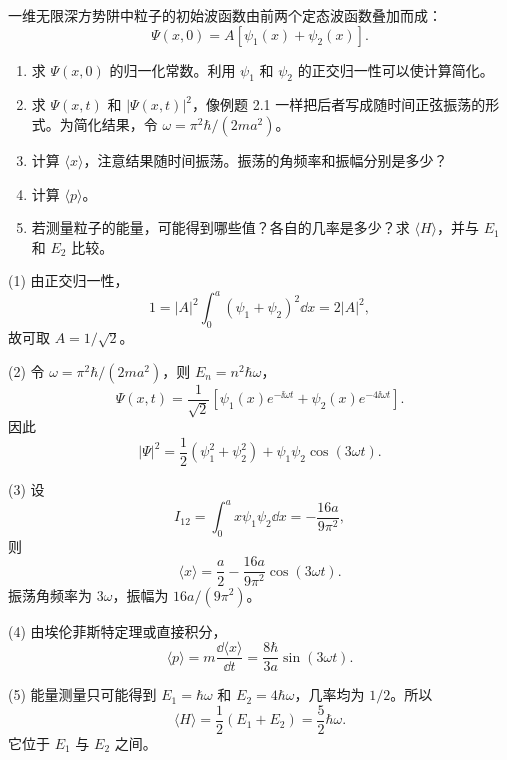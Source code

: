 \begin{question}
一维无限深方势阱中粒子的初始波函数由前两个定态波函数叠加而成：
\[
\Psi(x,0)=A[\psi_1(x)+\psi_2(x)] .
\]
\begin{enumerate}
\item 求 $\Psi(x,0)$ 的归一化常数。利用 $\psi_1$ 和 $\psi_2$ 的正交归一性可以使计算简化。
\item 求 $\Psi(x,t)$ 和 $|\Psi(x,t)|^2$，像例题 2.1 一样把后者写成随时间正弦振荡的形式。为简化结果，令 $\omega=\pi^2\hbar/(2ma^2)$。
\item 计算 $\langle x\rangle$，注意结果随时间振荡。振荡的角频率和振幅分别是多少？
\item 计算 $\langle p\rangle$。
\item 若测量粒子的能量，可能得到哪些值？各自的几率是多少？求 $\langle H\rangle$，并与 $E_1$ 和 $E_2$ 比较。
\end{enumerate}
\end{question}
\begin{solution}
(1) 由正交归一性，
\[
1=|A|^2\int_0^a(\psi_1+\psi_2)^2\dd x=2|A|^2,
\]
故可取 $A=1/\sqrt2$。

(2) 令 $\omega=\pi^2\hbar/(2ma^2)$，则 $E_n=n^2\hbar\omega$，
\[
\Psi(x,t)=\frac1{\sqrt2}\left[\psi_1(x)e^{-\ii\omega t}+\psi_2(x)e^{-4\ii\omega t}\right].
\]
因此
\[
|\Psi|^2=\frac12(\psi_1^2+\psi_2^2)+\psi_1\psi_2\cos(3\omega t).
\]

(3) 设
\[
I_{12}=\int_0^a x\psi_1\psi_2\dd x=-\frac{16a}{9\pi^2},
\]
则
\[
\langle x\rangle=\frac a2-\frac{16a}{9\pi^2}\cos(3\omega t).
\]
振荡角频率为 $3\omega$，振幅为 $16a/(9\pi^2)$。

(4) 由埃伦菲斯特定理或直接积分，
\[
\langle p\rangle=m\frac{\dd\langle x\rangle}{\dd t}
=\frac{8\hbar}{3a}\sin(3\omega t).
\]

(5) 能量测量只可能得到 $E_1=\hbar\omega$ 和 $E_2=4\hbar\omega$，几率均为 $1/2$。所以
\[
\langle H\rangle=\frac12(E_1+E_2)=\frac52\hbar\omega.
\]
它位于 $E_1$ 与 $E_2$ 之间。
\end{solution}

